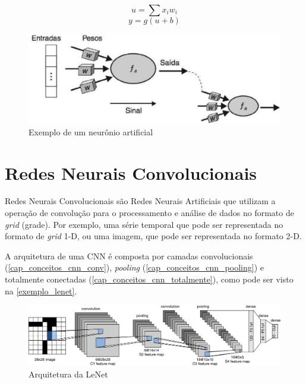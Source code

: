 \begin{equation}\label{eq_neuronio}
u = \sum x_i w_i
\end{equation}
\begin{equation}\label{eq_ativacao}
y = g(u + b)
\end{equation}

\begin{figure}[htb]
	\caption {\label{cap_conceitos_ex_neuronio} Exemplo de um neurônio artificial}
	\begin{center}
		\includegraphics[scale=0.3]{Imagens/exemplo_neuronio_artificial}
	\end{center}
\end{figure}

\section{Redes Neurais Convolucionais}\label{cap_conceitos_cnn}
Redes Neurais Convolucionais são Redes Neurais Artificiais que utilizam a operação de convolução para o processamento e
análise de dados no formato de \textit{grid} (grade).
Por exemplo, uma série temporal que pode ser representada no formato de \textit{grid} 1-D, ou uma imagem, que pode ser
representada no formato 2-D. \cite{Goodfellow-et-al-2016}

A arquitetura de uma CNN é composta por camadas convolucionais (\ref{cap_conceitos_cnn_conv}),
\textit{pooling} (\ref{cap_conceitos_cnn_pooling}) e totalmente conectadas (\ref{cap_conceitos_cnn_totalmente}),
como pode ser visto na \autoref{exemplo_lenet}.

\begin{figure}[htb]
	\caption {\label{exemplo_lenet} Arquitetura da LeNet}
	\begin{center}
		\includegraphics[scale=0.5]{Imagens/lenet}
	\end{center}
\end{figure}

